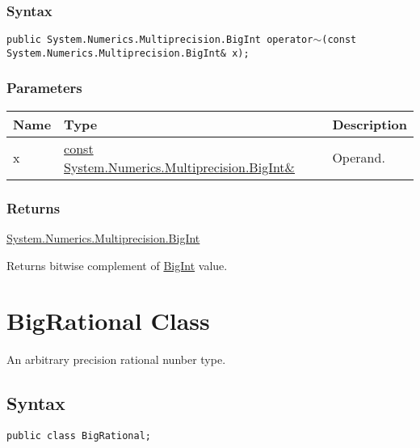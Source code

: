 \documentclass[a4paper,oneside,11.000000pt]{book}
\begin{document}
\subsubsection*{Syntax}
\texttt{public System.Numerics.Multiprecision.BigInt operator$\sim$(const System.Numerics.Multiprecision.BigInt\& x);}
\subsubsection*{Parameters}
\begin{flushleft}
\begin{supertabular}[l]{!{\raggedright}p{1.30721cm}!{\raggedright}p{8.55945cm}!{\raggedright}p{2.65538cm}}
\textbf{Name}
& \textbf{Type}
& \textbf{Description}
\\
\hline
x
& \hyperlink{System.Numerics.Multiprecision.BigInt}{const System.\-Numerics.\-Multiprecision.\-BigInt\&\-}
& Operand.

\\
\end{supertabular}

\end{flushleft}
\subsubsection*{Returns}
\hyperlink{System.Numerics.Multiprecision.BigInt}{System.\-Numerics.\-Multiprecision.\-BigInt}
\begin{flushleft}
Returns bitwise complement of \hyperlink{System.Numerics.Multiprecision.BigInt}{BigInt} value.

\end{flushleft}
\clearpage

\hypertarget{System.Numerics.Multiprecision.BigRational}{\section{BigRational Class}}\begin{flushleft}
An arbitrary precision rational nunber type.

\end{flushleft}

\subsection*{Syntax}\texttt{public class BigRational;}
\end{document}
